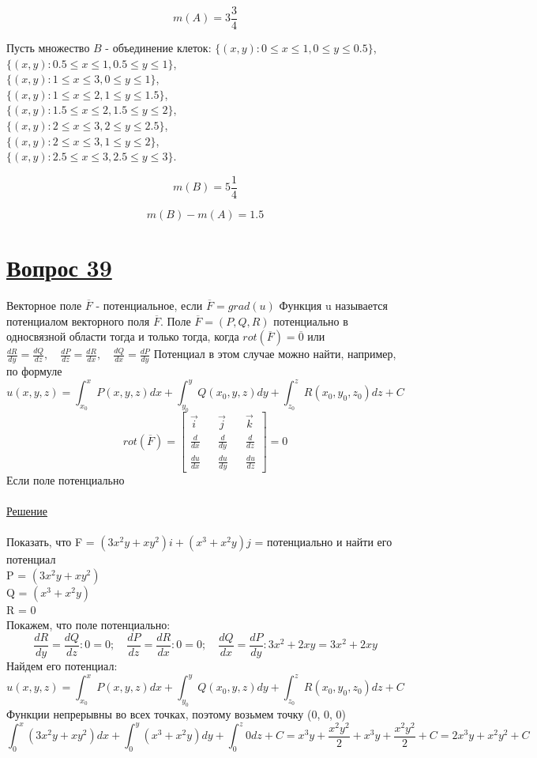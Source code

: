 \documentclass{report}
\begin{document}
\[m(A) = 3\frac{3}{4}\]

Пусть множество $B$ - объединение клеток:
$\{(x, y): 0 \leq x \leq 1, 0 \leq y \leq 0.5\}$,\\
$\{(x, y): 0.5 \leq x \leq 1, 0.5 \leq y \leq 1\}$,\\
$\{(x, y): 1 \leq x \leq 3, 0 \leq y \leq 1\}$,\\
$\{(x, y): 1 \leq x \leq 2, 1 \leq y \leq 1.5\}$,\\
$\{(x, y): 1.5 \leq x \leq 2, 1.5 \leq y \leq 2\}$,\\
$\{(x, y): 2 \leq x \leq 3, 2 \leq y \leq 2.5\}$,\\
$\{(x, y): 2 \leq x \leq 3, 1 \leq y \leq 2\}$,\\
$\{(x, y): 2.5 \leq x \leq 3, 2.5 \leq y \leq 3\}$.

\[m(B) = 5\frac{1}{4}\]

\[m(B) - m(A) = 1.5\]
\newpage


\section{\underline{Вопрос 39}}
  Векторное поле $\overline{F}$ - потенциальное, если  $\overline{F} = grad(u)$ Функция u называется потенциалом векторного поля $\overline{F}$. Поле $\overline{F} = (P, Q, R)$ потенциально в односвязной области тогда и только тогда, когда $rot(\overline{F}) = \overline{0}$ или $\frac{dR}{dy} = \frac{dQ}{dz}, \quad \frac{dP}{dz} = \frac{dR}{dx}, \quad \frac{dQ}{dx} = \frac{dP}{dy}$  Потенциал в этом случае можно найти, например, по формуле
\[
    u(x, y, z) = \int_{x_0}^x P(x, y, z)dx + \int_{y_0}^y Q(x_0, y, z)dy + \int_{z_0}^z R(x_0, y_0, z_0)dz + C
\]
\[
rot(\overline{F}) = \begin{bmatrix}\vec{i} && \vec{j} && \vec{k} \\ \frac{d}{dx} && \frac{d}{dy} && \frac{d}{dz} \\ \frac{du}{dx} && \frac{du}{dy} && \frac{du}{dz} \end{bmatrix} = 0
\]
Если поле потенциально \\ \\

\underline{Решение} \\ \\
Показать, что F = $(3x^2y+xy^2)i + (x^3+x^2y)j$ = потенциально и найти его потенциал \\
P = $(3x^2y+xy^2)$ \\
Q = $(x^3+x^2y)$ \\
R = 0 \\
Покажем, что поле потенциально:
\[
\frac{dR}{dy} = \frac{dQ}{dz}: 0 = 0; \quad \frac{dP}{dz} = \frac{dR}{dx}: 0 = 0; \quad \frac{dQ}{dx} = \frac{dP}{dy}: 3x^2+2xy = 3x^2+2xy
\]
Найдем его потенциал:
\[
    u(x, y, z) = \int_{x_0}^x P(x, y, z)dx + \int_{y_0}^y Q(x_0, y, z)dy + \int_{z_0}^z R(x_0, y_0, z_0)dz + C
\]
Функции непрерывны во всех точках, поэтому возьмем точку (0, 0, 0)
\[
    \int_0^x (3x^2y+xy^2)dx + \int_0^y (x^3+x^2y)dy + \int_0^z 0dz + C = x^3y+\frac{x^2y^2}{2}+x^3y+\frac{x^2y^2}{2} + C = 2x^3y+x^2y^2 + C
\]
\newpage
\end{document}
